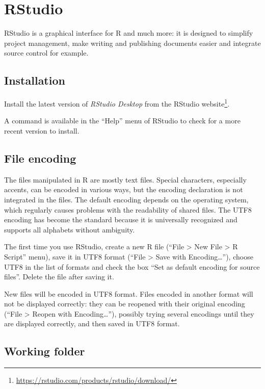 \documentclass[
  12pt,
  american,
  a4paper,
  extrafontsizes,onecolumn,openright
  ]{memoir}
\newlength{\rf}
\begin{document}
\section{RStudio}\label{rstudio}

RStudio is a graphical interface for R and much more: it is designed to simplify project management, make writing and publishing documents easier and integrate source control for example.

\subsection{Installation}\label{installation-1}

Install the latest version of \emph{RStudio Desktop} from the RStudio website\footnote{\url{https://rstudio.com/products/rstudio/download/}}.

A command is available in the \enquote{Help} menu of RStudio to check for a more recent version to install.

\subsection{File encoding}\label{file-encoding}

The files manipulated in R are mostly text files.
Special characters, especially accents, can be encoded in various ways, but the encoding declaration is not integrated in the files.
The default encoding depends on the operating system, which regularly causes problems with the readability of shared files.
The UTF8 encoding has become the standard because it is universally recognized and supports all alphabets without ambiguity.

The first time you use RStudio, create a new R file (\enquote{File \textgreater{} New File \textgreater{} R Script} menu), save it in UTF8 format (\enquote{File \textgreater{} Save with Encoding\ldots{}}), choose UTF8 in the list of formats and check the box \enquote{Set as default encoding for source files}.
Delete the file after saving it.

New files will be encoded in UTF8 format.
Files encoded in another format will not be displayed correctly: they can be reopened with their original encoding (\enquote{File \textgreater{} Reopen with Encoding\ldots{}}), possibly trying several encodings until they are displayed correctly, and then saved in UTF8 format.

\subsection{Working folder}\label{working-folder}
\end{document}
